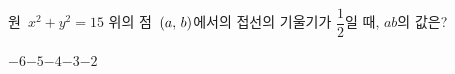 원~$x^2+y^2=15$ 위의 점~$(a,\mkern3mu b)$에서의 접선의 기울기가 $\dfrac{1}{2}$일 때, $ab$의 값은?
\begin{choices32}{$-6$}{$-5$}{$-4$}{$-3$}{$-2$}\end{choices32}
